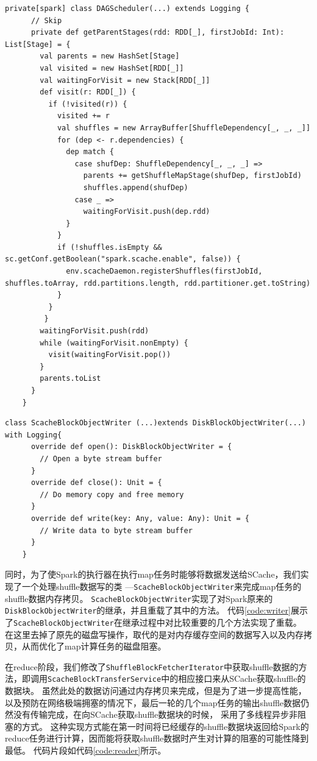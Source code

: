\begin{lstlisting}[style={myScalastyle}, caption={DAGScheduler代码片段}, label={code:dagScheduler}]
    private[spark] class DAGScheduler(...) extends Logging {
      // Skip
      private def getParentStages(rdd: RDD[_], firstJobId: Int): List[Stage] = {
        val parents = new HashSet[Stage]
        val visited = new HashSet[RDD[_]]
        val waitingForVisit = new Stack[RDD[_]]
        def visit(r: RDD[_]) {
          if (!visited(r)) {
            visited += r
            val shuffles = new ArrayBuffer[ShuffleDependency[_, _, _]]
            for (dep <- r.dependencies) {
              dep match {
                case shufDep: ShuffleDependency[_, _, _] =>
                  parents += getShuffleMapStage(shufDep, firstJobId)
                  shuffles.append(shufDep)
                case _ =>
                  waitingForVisit.push(dep.rdd)
              }
            }
            if (!shuffles.isEmpty && sc.getConf.getBoolean("spark.scache.enable", false)) {
              env.scacheDaemon.registerShuffles(firstJobId, shuffles.toArray, rdd.partitions.length, rdd.partitioner.get.toString)
            }
          }
         }
        waitingForVisit.push(rdd)
        while (waitingForVisit.nonEmpty) {
          visit(waitingForVisit.pop())
        }
        parents.toList
      }
    }
\end{lstlisting}
\begin{lstlisting}[style={myScalastyle}, caption={ScacheBlockObjectWriter代码片段}, label={code:writer}]
    class ScacheBlockObjectWriter (...)extends DiskBlockObjectWriter(...) with Logging{
      override def open(): DiskBlockObjectWriter = {
        // Open a byte stream buffer
      }
      override def close(): Unit = {
        // Do memory copy and free memory
      }
      override def write(key: Any, value: Any): Unit = {
        // Write data to byte stream buffer
      }
    }
\end{lstlisting}
同时，为了使Spark的执行器在执行map任务时能够将数据发送给SCache，我们实现了一个处理shuffle数据写的类
---\verb|ScacheBlockObjectWriter|来完成map任务的shuffle数据内存拷贝。
\verb|ScacheBlockObjectWriter|实现了对Spark原来的\verb|DiskBlockObjectWriter|的继承，并且重载了其中的方法。
代码\ref{code:writer}展示了\verb|ScacheBlockObjectWriter|在继承过程中对比较重要的几个方法实现了重载。
在这里去掉了原先的磁盘写操作，取代的是对内存缓存空间的数据写入以及内存拷贝，从而优化了map计算任务的磁盘阻塞。

在reduce阶段，我们修改了\verb|ShuffleBlockFetcherIterator|中获取shuffle数据的方法，即调用\verb|ScacheBlockTransferService|中的相应接口来从SCache获取shuffle的数据块。
虽然此处的数据访问通过内存拷贝来完成，但是为了进一步提高性能，以及预防在网络极端拥塞的情况下，最后一轮的几个map任务的输出shuffle数据仍然没有传输完成，在向SCache获取shuffle数据块的时候，
采用了多线程异步非阻塞的方式。
这种实现方式能在第一时间将已经缓存的shuffle数据块返回给Spark的reduce任务进行计算，因而能将获取shuffle数据时产生对计算的阻塞的可能性降到最低。
代码片段如代码\ref{code:reader}所示。

